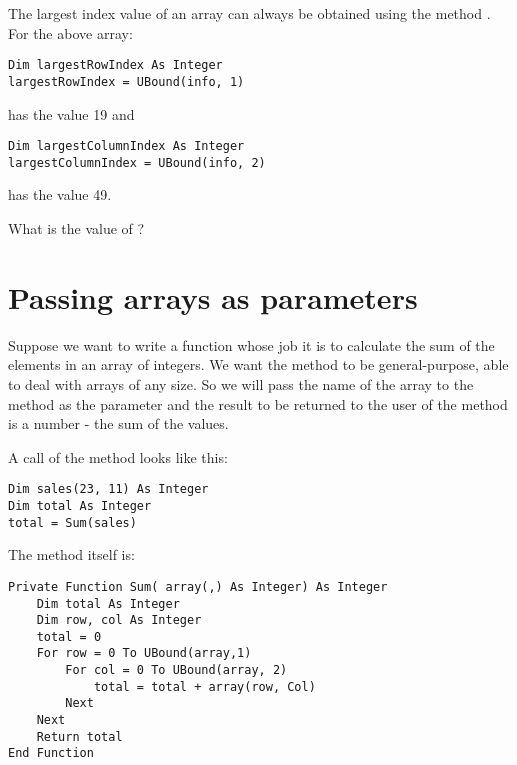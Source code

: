 		The largest index value of an array can always be obtained using the method . For the above array:
		\begin{lstlisting}
Dim largestRowIndex As Integer
largestRowIndex = UBound(info, 1)
		\end{lstlisting}
		has the value 19 and
		\begin{lstlisting}
Dim largestColumnIndex As Integer
largestColumnIndex = UBound(info, 2)
		\end{lstlisting}
		has the value 49.

		\begin{stqb}
			\begin{STQ}
		\item	What is the value of ?
			\end{STQ}
		\end{stqb}


	\section{Passing arrays as parameters}
		Suppose we want to write a function whose job it is to calculate the sum of the elements in an array of integers. We want the method to be general-purpose, able to deal with arrays of any size. So we will pass the name of the array to the method as the parameter and the result to be returned to the user of the method is a number - the sum of the values.

		A call of the method looks like this:
		\begin{lstlisting}
Dim sales(23, 11) As Integer
Dim total As Integer
total = Sum(sales)
		\end{lstlisting}
		The method itself is:
		\begin{lstlisting}
Private Function Sum( array(,) As Integer) As Integer
	Dim total As Integer
	Dim row, col As Integer
	total = 0
	For row = 0 To UBound(array,1)
		For col = 0 To UBound(array, 2)
			total = total + array(row, Col)
		Next
	Next
	Return total
End Function
		\end{lstlisting}



